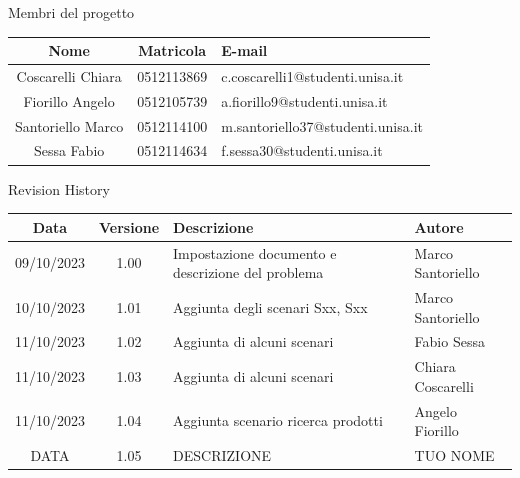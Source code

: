 \documentclass[12pt, a4paper, oneside]{book}
\begin{document}
    \newpage
    \begin{center}
    {\LARGE{Membri del progetto}}
    \end{center}
    \begin{center}
        \begin{tabular}{|c|c|m{8cm}|}
            \hline
            \cellcolor{lightgray} \textbf{Nome} & \cellcolor{lightgray} \textbf{Matricola} & \cellcolor{lightgray} \textbf{E-mail}\\ \hline
            Coscarelli  Chiara & 0512113869 & c.coscarelli1@studenti.unisa.it\\ \hline
            Fiorillo Angelo & 0512105739 & a.fiorillo9@studenti.unisa.it\\ \hline
            Santoriello Marco &  0512114100 & m.santoriello37@studenti.unisa.it\\ \hline
            Sessa Fabio & 0512114634 & f.sessa30@studenti.unisa.it\\ \hline
        \end{tabular}
    \end{center}

    \begin{center}
    {\LARGE{Revision History}}
    \end{center}

    \begin{center}
        \begin{tabular}{|c|c|m{8cm}|m{3.5cm}|}
            \hline
            \cellcolor{lightgray} \textbf{Data} & \cellcolor{lightgray} \textbf{Versione} & \cellcolor{lightgray} \textbf{Descrizione} & \cellcolor{lightgray} \textbf{Autore}\\ \hline
            09/10/2023 & 1.00 & Impostazione documento e descrizione del problema & Marco Santoriello\\ \hline
            10/10/2023 & 1.01 & Aggiunta degli scenari Sxx, Sxx & Marco Santoriello\\ \hline
            11/10/2023 & 1.02 & Aggiunta di alcuni scenari & Fabio Sessa\\ \hline
            11/10/2023 & 1.03 & Aggiunta di alcuni scenari & Chiara Coscarelli\\ \hline
            11/10/2023 & 1.04 & Aggiunta scenario ricerca prodotti & Angelo Fiorillo\\ \hline
            DATA & 1.05 & DESCRIZIONE & TUO NOME\\ \hline
        \end{tabular}
    \end{center}
\end{document}

